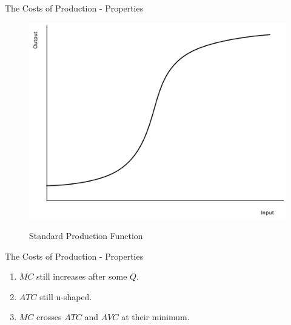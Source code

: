 \documentclass[xcolor={dvipsnames},pdf, hyperref={colorlinks=true, citecolor=ForestGreen, linkcolor=BlueViolet, urlcolor=Magenta}]{beamer}
\newcommand{\ddp}[1]{{\textcolor{ForestGreen}{#1}}}
\begin{document}
\begin{frame}[b]{The Costs of Production - Properties}
		\begin{figure}[H]
			\centering
				\ddp{\includegraphics[scale=.35]{plot58.pdf}}
				\caption{Standard Production Function}
		\end{figure}
\end{frame}

\begin{frame}{The Costs of Production - Properties}
	\begin{enumerate}
		\item $MC$ still increases after some $Q$.
		\item $ATC$ still u-shaped.
		\item $MC$ crosses $ATC$ and $AVC$ at their minimum.
	\end{enumerate}
\end{frame}
\end{document}
